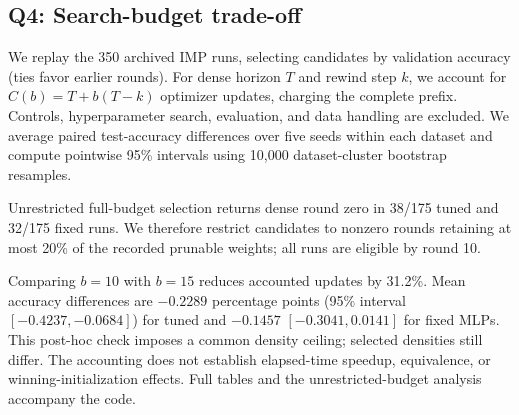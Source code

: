 \subsection{Q4: Search-budget trade-off}
\label{sec:shang-cost}
We replay the 350 archived IMP runs, selecting candidates by validation accuracy (ties favor earlier rounds). For dense horizon $T$ and rewind step $k$, we account for $C(b)=T+b(T-k)$ optimizer updates, charging the complete prefix. Controls, hyperparameter search, evaluation, and data handling are excluded. We average paired test-accuracy differences over five seeds within each dataset and compute pointwise 95\% intervals using 10,000 dataset-cluster bootstrap resamples.

Unrestricted full-budget selection returns dense round zero in 38/175 tuned and 32/175 fixed runs. We therefore restrict candidates to nonzero rounds retaining at most 20\% of the recorded prunable weights; all runs are eligible by round 10.

Comparing $b=10$ with $b=15$ reduces accounted updates by 31.2\%. Mean accuracy differences are $-0.2289$ percentage points (95\% interval $[-0.4237,-0.0684]$) for tuned and $-0.1457$ $[-0.3041,0.0141]$ for fixed MLPs. This post-hoc check imposes a common density ceiling; selected densities still differ. The accounting does not establish elapsed-time speedup, equivalence, or winning-initialization effects. Full tables and the unrestricted-budget analysis accompany the code.
